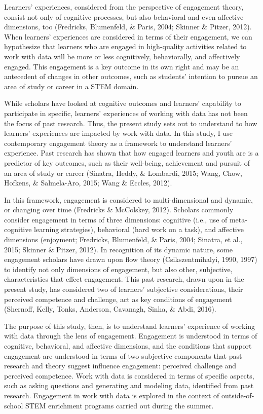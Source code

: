 \documentclass[]{msu-thesis}
\theoremstyle{definition}
\theoremstyle{definition}
\theoremstyle{definition}
\theoremstyle{remark}
\begin{document}
Learners' experiences, considered from the perspective of engagement
theory, consist not only of cognitive processes, but also behavioral and
even affective dimensions, too (Fredricks, Blumenfeld, \& Paris, 2004;
Skinner \& Pitzer, 2012). When learners' experiences are considered in
terms of their engagement, we can hypothesize that learners who are
engaged in high-quality activities related to work with data will be
more or less cognitively, behaviorally, and affectively engaged. This
engagement is a key outcome in its own right and may be an antecedent of
changes in other outcomes, such as students' intention to pursue an area
of study or career in a STEM domain.

While scholars have looked at cognitive outcomes and learners'
capability to participate in specific, learners' experiences of working
with data has not been the focus of past research. Thus, the present
study sets out to understand to how learners' experiences are impacted
by work with data. In this study, I use contemporary engagement theory
as a framework to understand learners' experience. Past research has
shown that how engaged learners and youth are is a predictor of key
outcomes, such as their well-being, achievement and pursuit of an area
of study or career (Sinatra, Heddy, \& Lombardi, 2015; Wang, Chow,
Hofkens, \& Salmela-Aro, 2015; Wang \& Eccles, 2012).

In this framework, engagement is considered to multi-dimensional and
dynamic, or changing over time (Fredricks \& McColskey, 2012). Scholars
commonly consider engagement in terms of three dimensions: cognitive
(i.e., use of meta-cognitive learning strategies), behavioral (hard work
on a task), and affective dimensions (enjoyment; Fredricks, Blumenfeld,
\& Paris, 2004; Sinatra, et al., 2015; Skinner \& Pitzer, 2012). In
recognition of its dynamic nature, some engagement scholars have drawn
upon flow theory (Csikszentmihalyi, 1990, 1997) to identify not only
dimensions of engagement, but also other, subjective, characteristics
that effect engagement. This past research, drawn upon in the present
study, has considered two of learners' subjective considerations, their
perceived competence and challenge, act as key conditions of engagement
(Shernoff, Kelly, Tonks, Anderson, Cavanagh, Sinha, \& Abdi, 2016).

The purpose of this study, then, is to understand learners' experience
of working with data through the lens of engagement. Engagement is
understood in terms of cognitive, behavioral, and affective dimensions,
and the conditions that support engagement are understood in terms of
two subjective components that past research and theory suggest
influence engagement: perceived challenge and perceived competence. Work
with data is considered in terms of specific aspects, such as asking
questions and generating and modeling data, identified from past
research. Engagement in work with data is explored in the context of
outside-of-school STEM enrichment programs carried out during the
summer.
\end{document}
